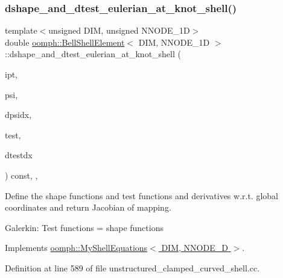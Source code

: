 \subsubsection{\texorpdfstring{dshape\+\_\+and\+\_\+dtest\+\_\+eulerian\+\_\+at\+\_\+knot\+\_\+shell()}{dshape\_and\_dtest\_eulerian\_at\_knot\_shell()}}
{\footnotesize\ttfamily template$<$unsigned D\+IM, unsigned N\+N\+O\+D\+E\+\_\+1D$>$ \\
double \hyperlink{classoomph_1_1BellShellElement}{oomph\+::\+Bell\+Shell\+Element}$<$ D\+IM, N\+N\+O\+D\+E\+\_\+1D $>$\+::dshape\+\_\+and\+\_\+dtest\+\_\+eulerian\+\_\+at\+\_\+knot\+\_\+shell (\begin{DoxyParamCaption}\item[{const unsigned \&}]{ipt,  }\item[{Shape \&}]{psi,  }\item[{D\+Shape \&}]{dpsidx,  }\item[{Shape \&}]{test,  }\item[{D\+Shape \&}]{dtestdx }\end{DoxyParamCaption}) const\hspace{0.3cm}{\ttfamily [inline]}, {\ttfamily [protected]}, {\ttfamily [virtual]}}

Define the shape functions and test functions and derivatives w.\+r.\+t. global coordinates and return Jacobian of mapping.

Galerkin\+: Test functions = shape functions 

Implements \hyperlink{classoomph_1_1MyShellEquations_a0800ff2f9716a3b0327624948ce792e1}{oomph\+::\+My\+Shell\+Equations$<$ D\+I\+M, N\+N\+O\+D\+E\+\_\+D $>$}.



Definition at line 589 of file unstructured\+\_\+clamped\+\_\+curved\+\_\+shell.\+cc.

\mbox{\label{classoomph_1_1BellShellElement_aab519c12f08b5a723d6eab3e1a0a3e84}} 

